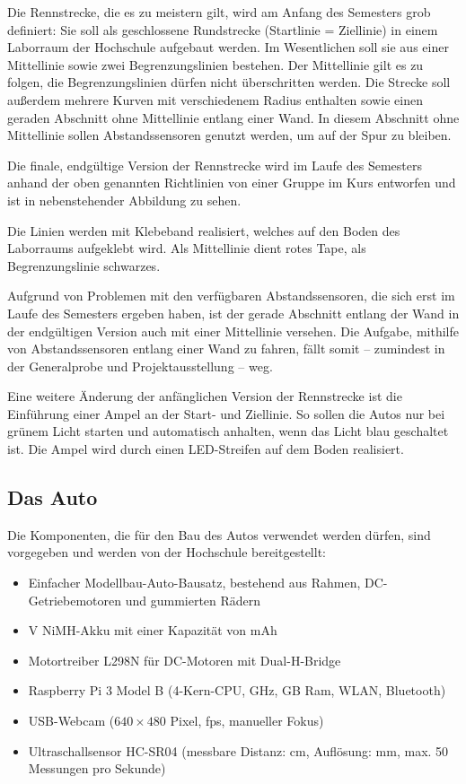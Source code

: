 \documentclass[a4paper, 12pt]{scrartcl}
\begin{document}
Die Rennstrecke, die es zu meistern gilt, wird am Anfang des Semesters grob definiert: Sie soll als geschlossene Rundstrecke (Startlinie = Ziellinie) in einem Laborraum der Hochschule aufgebaut werden. Im Wesentlichen soll sie aus einer Mittellinie sowie zwei Begrenzungslinien bestehen. Der Mittellinie gilt es zu folgen, die Begrenzungslinien dürfen nicht überschritten werden. Die Strecke soll außerdem mehrere Kurven mit verschiedenem Radius enthalten sowie einen geraden Abschnitt ohne Mittellinie entlang einer Wand. In diesem Abschnitt ohne Mittellinie sollen Abstandssensoren genutzt werden, um auf der Spur zu bleiben.

Die finale, endgültige Version der Rennstrecke wird im Laufe des Semesters anhand der oben genannten Richtlinien von einer Gruppe im Kurs entworfen und ist in nebenstehender Abbildung zu sehen.

Die Linien werden mit Klebeband realisiert, welches auf den Boden des Laborraums aufgeklebt wird. Als Mittellinie dient rotes Tape, als Begrenzungslinie schwarzes.

Aufgrund von Problemen mit den verfügbaren Abstandssensoren, die sich erst im Laufe des Semesters ergeben haben, ist der gerade Abschnitt entlang der Wand in der endgültigen Version auch mit einer Mittellinie versehen. Die Aufgabe, mithilfe von Abstandssensoren entlang einer Wand zu fahren, fällt somit -- zumindest in der Generalprobe und Projektausstellung -- weg.

Eine weitere Änderung der anfänglichen Version der Rennstrecke ist die Einführung einer Ampel an der Start- und Ziellinie. So sollen die Autos nur bei grünem Licht starten und automatisch anhalten, wenn das Licht blau geschaltet ist. Die Ampel wird durch einen LED-Streifen auf dem Boden realisiert.

\subsection{Das Auto}
Die Komponenten, die für den Bau des Autos verwendet werden dürfen, sind vorgegeben und werden von der Hochschule bereitgestellt:

\begin{itemize}
	\item Einfacher Modellbau-Auto-Bausatz, bestehend aus Rahmen, DC-Getriebemotoren und gummierten Rädern
	\item \unit[7,2]{V} NiMH-Akku mit einer Kapazität von \unit[4000]{mAh}
	\item Motortreiber L298N für DC-Motoren mit Dual-H-Bridge
	\item Raspberry Pi 3 Model B (4-Kern-CPU, \unit[1,2]{GHz}, \unit[1]{GB} Ram, WLAN, Bluetooth)
	\item USB-Webcam ($640\times 480$ Pixel, \unit[30]{fps}, manueller Fokus)
	\item Ultraschallsensor HC-SR04 (messbare Distanz: \unit[2--300]{cm}, Auflösung: \unit[3]{mm}, max. 50 Messungen pro Sekunde)
\end{itemize}
\end{document}

